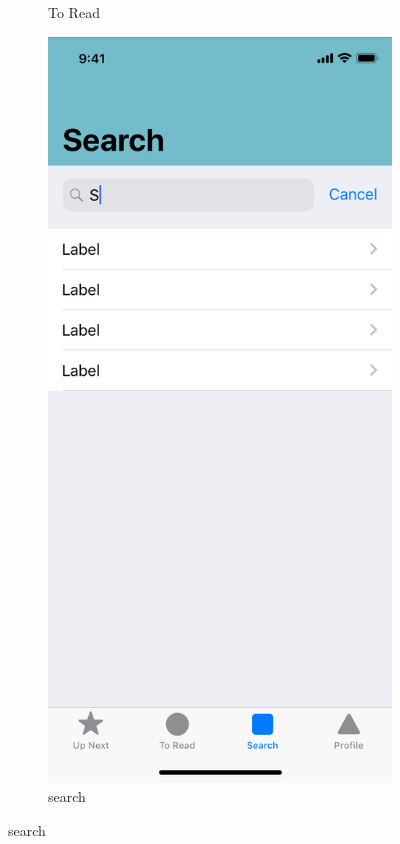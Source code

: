 \begin{figure}[p]
\begin{subfigure}[b]{0.4\textwidth}
    \caption{To Read}
    \label{fig:1}
  \end{subfigure}
  \hfill
  \begin{subfigure}[b]{0.4\textwidth}
    \includegraphics[width=\textwidth]{img/mockups/search}
    \caption{search}
    \label{fig:2}
  \end{subfigure}
\end{figure}

